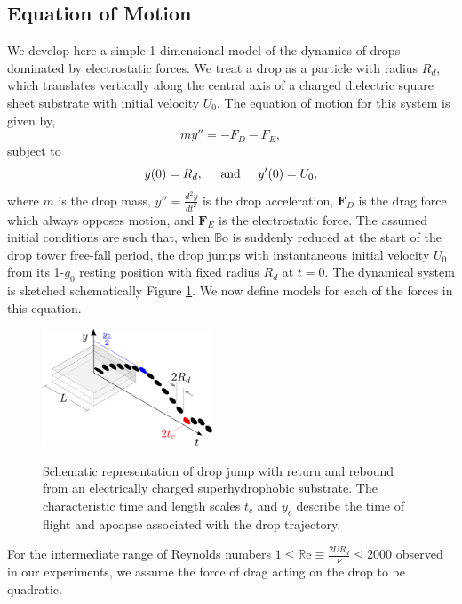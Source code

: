 \documentclass[aip,reprint, floatfix]{revtex4-1}
\begin{document}
\subsection{Equation of Motion}
We develop here a simple 1-dimensional model of the dynamics of drops dominated by electrostatic forces. We treat a drop as a particle with radius $R_d$, which translates vertically along the central axis of a charged dielectric square sheet substrate with initial velocity $U_0$. The equation of motion for this system is given by,
\begin{equation}
m y'' = - F_D - F_E,
\label{gov_eqn}
\end{equation}
subject to
\begin{equation}
y(0) = R_d, \hspace{5 mm} \mbox{and} \hspace{5 mm} y'(0) = U_0,
\end{equation}
where $m$ is the drop mass, $y'' = \frac{d^2 y}{d t^2}$ is the drop acceleration, $\mathbf{F}_D$ is the drag force which always opposes motion, and $\mathbf{F}_E$ is the electrostatic force. The assumed initial conditions are such that, when $\mathbb{B}\mbox{o}$ is suddenly reduced at the start of the drop tower free-fall period, the drop jumps with instantaneous initial velocity $U_0$ from its 1-$g_0$ resting position with fixed radius $R_d$ at $t=0$. The dynamical system is sketched schematically Figure \ref{apparatus}. We now define models for each of the forces in this equation.

\begin{figure}[ht]
\centering
\includegraphics[width=0.45\textwidth]{../figures/apparatus1.pdf}
\label{apparatus}
\caption{Schematic representation of drop jump with return and rebound from an electrically charged superhydrophobic substrate. The characteristic time and length scales $t_c$ and $y_c$ describe the time of flight and apoapse associated with the drop trajectory.}
\end{figure}

For the intermediate range of Reynolds numbers $1 \leq \mathbb{R}\mbox{e} \equiv \frac{2UR_d}{\nu} \leq 2000 $ observed in our experiments, we assume the force of drag acting on the drop to be quadratic.
\end{document}

